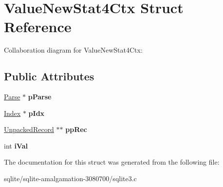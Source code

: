 \hypertarget{struct_value_new_stat4_ctx}{\section{Value\+New\+Stat4\+Ctx Struct Reference}
\label{struct_value_new_stat4_ctx}
}


Collaboration diagram for Value\+New\+Stat4\+Ctx\+:
\subsection*{Public Attributes}
\begin{DoxyCompactItemize}
\item 
\hypertarget{struct_value_new_stat4_ctx_aa1d5c751a45f4e608dbd883179dd2f18}{\hyperlink{struct_parse}{Parse} $\ast$ {\bfseries p\+Parse}}\label{struct_value_new_stat4_ctx_aa1d5c751a45f4e608dbd883179dd2f18}

\item 
\hypertarget{struct_value_new_stat4_ctx_a31a0ab3baf8fab451df095591408acad}{\hyperlink{struct_index}{Index} $\ast$ {\bfseries p\+Idx}}\label{struct_value_new_stat4_ctx_a31a0ab3baf8fab451df095591408acad}

\item 
\hypertarget{struct_value_new_stat4_ctx_a64e1490828ea95f9edc650a776a121d9}{\hyperlink{struct_unpacked_record}{Unpacked\+Record} $\ast$$\ast$ {\bfseries pp\+Rec}}\label{struct_value_new_stat4_ctx_a64e1490828ea95f9edc650a776a121d9}

\item 
\hypertarget{struct_value_new_stat4_ctx_a54d56872d3653e59a00a91ea1c6b7664}{int {\bfseries i\+Val}}\label{struct_value_new_stat4_ctx_a54d56872d3653e59a00a91ea1c6b7664}

\end{DoxyCompactItemize}


The documentation for this struct was generated from the following file\+:\begin{DoxyCompactItemize}
\item 
sqlite/sqlite-\/amalgamation-\/3080700/sqlite3.\+c\end{DoxyCompactItemize}
